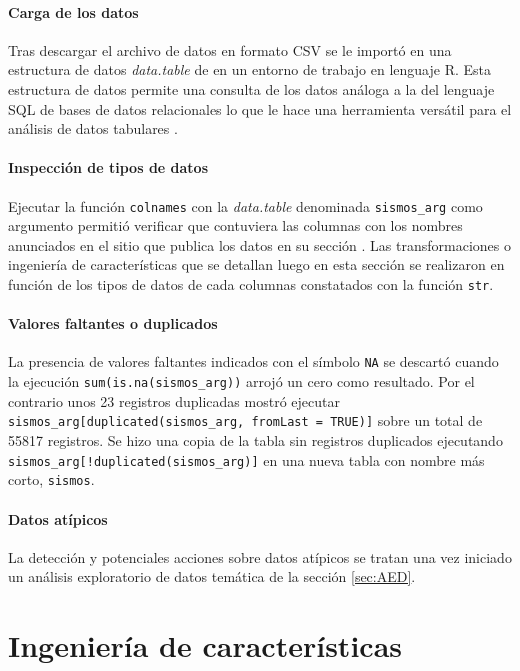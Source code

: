 \documentclass[a4paper]{report}
\begin{document}
\paragraph{Carga de los datos}
Tras descargar el archivo de datos en formato CSV se le importó en una estructura de datos \emph{data.table} de en un entorno de trabajo en lenguaje R.
Esta estructura de datos permite una consulta de los datos análoga a la del lenguaje SQL de bases de datos relacionales lo que le hace una herramienta versátil para el análisis de datos tabulares \cite{noauthor_introduction_2024}.

\paragraph{Inspección de tipos de datos}
Ejecutar la función \verb'colnames' con la \emph{data.table} denominada \verb'sismos_arg' como argumento permitió verificar que contuviera las columnas con los nombres anunciados en el sitio que publica los datos en su sección \cite[Exploración inicial]{daniela_parada_ic-datasets-docencia_nodate}.
Las transformaciones o ingeniería de características que se detallan luego en esta sección se realizaron en función de los tipos de datos de cada columnas constatados con la función \verb'str'.


\paragraph{Valores faltantes o duplicados}
La presencia de valores faltantes indicados con el símbolo \verb'NA' se descartó cuando la ejecución \verb'sum(is.na(sismos_arg))' arrojó un cero como resultado.
Por el contrario unos \num{23} registros duplicadas mostró
ejecutar \verb'sismos_arg[duplicated(sismos_arg, fromLast = TRUE)]' sobre un total de \num{55817} registros.
Se hizo una copia de la tabla sin registros duplicados ejecutando \verb'sismos_arg[!duplicated(sismos_arg)]' en una nueva tabla con nombre más corto, \verb'sismos'.


\paragraph{Datos atípicos}
La detección y potenciales acciones sobre datos atípicos se tratan una vez iniciado un análisis exploratorio de datos temática de la sección \ref{sec:AED}.



\section{Ingeniería de características}\label{sec:ingeniería}
\end{document}
